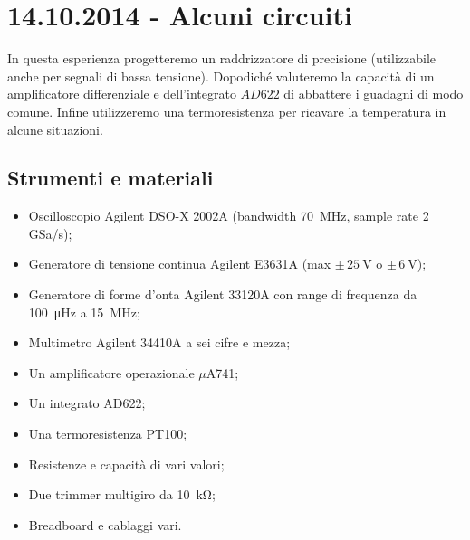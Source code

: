 \section{14.10.2014 - Alcuni circuiti}

In questa esperienza progetteremo un raddrizzatore di precisione (utilizzabile anche per segnali di bassa tensione). Dopodiché valuteremo la capacità di un amplificatore differenziale e dell'integrato $AD622$ di abbattere i guadagni di modo comune. Infine utilizzeremo una termoresistenza per ricavare la temperatura in alcune situazioni.

\subsection*{Strumenti e materiali}

\begin{itemize} [noitemsep]
\item Oscilloscopio Agilent DSO-X 2002A (bandwidth \SI{70}{\mega\hertz}, sample rate \num{2} GSa/s);
\item Generatore di tensione continua Agilent E3631A (max $\pm \, \SI{25}{\volt}$ o $\pm \, \SI{6}{\volt}$);
\item Generatore di forme d'onta Agilent 33120A con range di frequenza da \SI{100}{\micro\hertz} a \SI{15}{\mega\hertz};
\item Multimetro Agilent 34410A a sei cifre e mezza;
\item Un amplificatore operazionale $\mu$A741;
\item Un integrato AD622;
\item Una termoresistenza PT100;
\item Resistenze e capacità di vari valori;
\item Due trimmer multigiro da \SI{10}{\kilo\ohm};
\item Breadboard e cablaggi vari.
\end{itemize}
